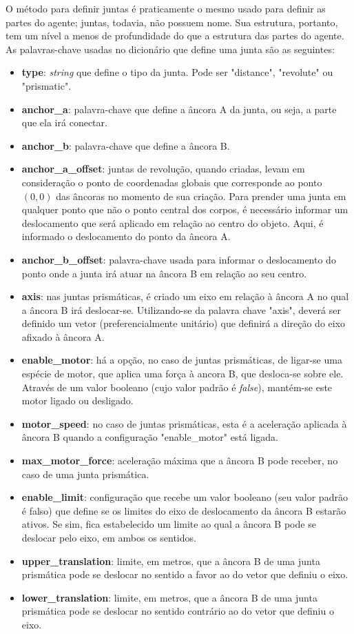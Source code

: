 \documentclass[cic,tc]{iiufrgs}
\begin{document}
    O método para definir juntas é praticamente o mesmo usado para definir as partes do agente; juntas, todavia, não possuem nome. Sua estrutura, portanto, tem
    um nível a menos de profundidade do que a estrutura das partes do agente. As palavras-chave usadas no dicionário que define uma junta são as seguintes:
    \begin{itemize}
      \item \textbf{type}: \textit{string} que define o tipo da junta. Pode ser "distance", "revolute" ou "prismatic".
      \item \textbf{anchor\_a}: palavra-chave que define a âncora A da junta, ou seja, a parte que ela irá conectar.
      \item \textbf{anchor\_b}: palavra-chave que define a âncora B.
      \item \textbf{anchor\_a\_offset}: juntas de revolução, quando criadas, levam em consideração o ponto de coordenadas globais que corresponde ao ponto $(0,0)$
      das âncoras no momento de sua criação. Para prender uma junta em qualquer ponto que não o ponto central dos corpos, é necessário informar um deslocamento
      que será aplicado em relação ao centro do objeto. Aqui, é informado o deslocamento do ponto da âncora A.
      \item \textbf{anchor\_b\_offset}: palavra-chave usada para informar o deslocamento do ponto onde a junta irá atuar na âncora B em relação ao seu centro.
      \item \textbf{axis}: nas juntas prismáticas, é criado um eixo em relação à âncora A no qual a âncora B irá deslocar-se. Utilizando-se da palavra chave "axis",
      deverá ser definido um vetor (preferencialmente unitário) que definirá a direção do eixo afixado à âncora A.
      \item \textbf{enable\_motor}: há a opção, no caso de juntas prismáticas, de ligar-se uma espécie de motor, que aplica uma força à ancora B, que desloca-se
      sobre ele. Através de um valor booleano (cujo valor padrão é \textit{false}), mantém-se este motor ligado ou desligado.
      \item \textbf{motor\_speed}: no caso de juntas prismáticas, esta é a aceleração aplicada à âncora B quando a configuração "enable\_motor" está ligada.
      \item \textbf{max\_motor\_force}: aceleração máxima que a âncora B pode receber, no caso de uma junta prismática.
      \item \textbf{enable\_limit}: configuração que recebe um valor booleano (seu valor padrão é falso) que define se os limites do eixo de deslocamento da âncora B
      estarão ativos. Se sim, fica estabelecido um limite ao qual a âncora B pode se deslocar pelo eixo, em ambos os sentidos.
      \item \textbf{upper\_translation}: limite, em metros, que a âncora B de uma junta prismática pode se deslocar no sentido a favor ao do vetor que definiu o eixo.
      \item \textbf{lower\_translation}: limite, em metros, que a âncora B de uma junta prismática pode se deslocar no sentido contrário ao do vetor que definiu o eixo.
    
    \end{itemize}
    
\end{document}
